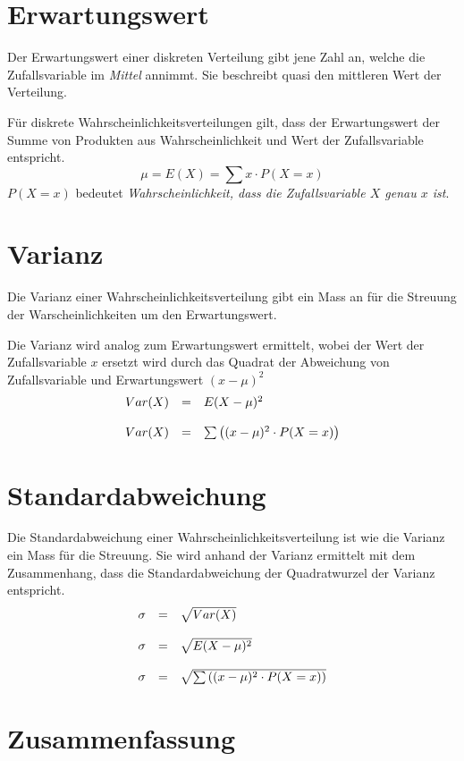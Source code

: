 \clearpage

\section{Erwartungswert}
Der Erwartungswert einer diskreten Verteilung gibt jene Zahl an,
welche die Zufallsvariable im \emph{Mittel} annimmt. Sie beschreibt
quasi den mittleren Wert der Verteilung.

Für diskrete Wahrscheinlichkeitsverteilungen gilt, dass der 
Erwartungswert der Summe von Produkten aus Wahrscheinlichkeit und
Wert der Zufallsvariable entspricht. 
\[ \mu = E(X) = \sum x \cdot P(X=x) \]
$P(X=x)$ bedeutet \emph{Wahrscheinlichkeit, dass die Zufallsvariable $X$ 
genau $x$ ist}.


\section{Varianz}
Die Varianz einer Wahrscheinlichkeitsverteilung gibt ein Mass an für 
die Streuung der Warscheinlichkeiten um den Erwartungswert.

Die Varianz wird analog zum Erwartungswert ermittelt, wobei der Wert
der Zufallsvariable $x$ ersetzt wird durch das Quadrat der Abweichung
von Zufallsvariable und Erwartungswert $(x-\mu)^2$
\[ \begin{array}{l c l}
	Var(X) 
		& = 
		& E(X-\mu)^2 \\
	& &  \\
	Var(X)
		& = 
		& \sum \left( (x-\mu)^2 \cdot P(X=x) \right)
\end{array} \]

\section{Standardabweichung}
Die Standardabweichung einer Wahrscheinlichkeitsverteilung 
ist wie die Varianz ein Mass für die Streuung. Sie 
wird anhand der Varianz ermittelt mit dem Zusammenhang, dass die 
Standardabweichung der Quadratwurzel der Varianz entspricht.
\[ \begin{array}{l c l} 
	\sigma 
		& = 
		& \sqrt{Var(X)} \\
	& & \\
	\sigma
		& =
		& \sqrt{E(X-\mu)^2} \\
	& & \\
	\sigma
		& =
		& \sqrt{\sum \left( (x-\mu)^2 \cdot P(X=x) \right)}
\end{array} \]

\section{Zusammenfassung}

